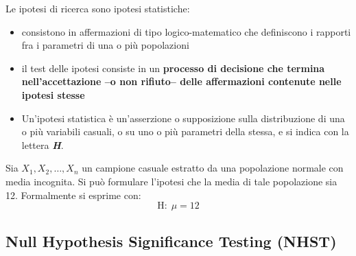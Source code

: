 \documentclass[
  ignorenonframetext,
  compress, aspectratio=149]{beamer}
\providecommand{\tightlist}{%
  \setlength{\itemsep}{0pt}\setlength{\parskip}{0pt}}
\begin{document}
\begin{frame}{}
\label{section-11}
\small

Le ipotesi di ricerca sono ipotesi statistiche:

\begin{itemize}
\tightlist
\item
  consistono in affermazioni di tipo logico-matematico che definiscono i
  rapporti fra i parametri di una o più popolazioni
\item
  il test delle ipotesi consiste in un \textbf{processo di decisione che
  termina nell'accettazione --o non rifiuto-- delle affermazioni
  contenute nelle ipotesi stesse}
\item
  Un'ipotesi statistica è un'asserzione o supposizione sulla
  distribuzione di una o più variabili casuali, o su uno o più parametri
  della stessa, e si indica con la lettera \textbf{\emph{H}}.
\end{itemize}

\begin{tcolorbox}[enhanced jigsaw, opacityback=0, bottomtitle=1mm, bottomrule=.15mm, titlerule=0mm, coltitle=black, toprule=.15mm, breakable, toptitle=1mm, colbacktitle=quarto-callout-note-color!10!white, arc=.35mm, title={Esempio}, rightrule=.15mm, leftrule=.75mm, opacitybacktitle=0.6, left=2mm, colframe=quarto-callout-note-color-frame, colback=white]

Sia \(X_1, X_2, \ldots, X_n\) un campione casuale estratto da una
popolazione normale con media incognita. Si può formulare l'ipotesi che
la media di tale popolazione sia 12. Formalmente si esprime con:
\[\text{H}:\; \mu = 12\]

\end{tcolorbox}
\end{frame}

\subsection{Null Hypothesis Significance Testing
(NHST)}\label{null-hypothesis-significance-testing-nhst}
\end{document}
